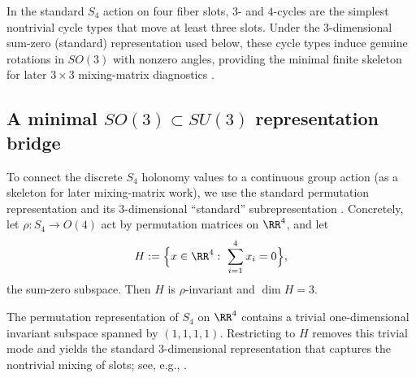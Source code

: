 \begin{remark}\label{rem:why_34_cycles}
In the standard $S_4$ action on four fiber slots, $3$- and $4$-cycles are the simplest nontrivial cycle types that move at least three slots.
Under the $3$-dimensional sum-zero (standard) representation used below, these cycle types induce genuine rotations in $SO(3)$ with nonzero angles, providing the minimal finite skeleton for later $3\times 3$ mixing-matrix diagnostics \cite{Serre1977}.
\end{remark}

\subsection{A minimal \texorpdfstring{$SO(3)\subset SU(3)$}{SO(3) subset SU(3)} representation bridge}
\label{subsec:holonomy_su3_bridge}

To connect the discrete $S_4$ holonomy values to a continuous group action (as a skeleton for later mixing-matrix work), we use the standard permutation representation and its $3$-dimensional ``standard'' subrepresentation \cite{Serre1977}.
Concretely, let $\rho:S_4\to O(4)$ act by permutation matrices on $\RR^4$, and let
\[
H:=\Bigl\{x\in\RR^4:\ \sum_{i=1}^4 x_i=0\Bigr\},
\]
the sum-zero subspace. Then $H$ is $\rho$-invariant and $\dim H=3$.
\begin{remark}\label{rem:sum_zero_canonical}
The permutation representation of $S_4$ on $\RR^4$ contains a trivial one-dimensional invariant subspace spanned by $(1,1,1,1)$.
Restricting to $H$ removes this trivial mode and yields the standard $3$-dimensional representation that captures the nontrivial mixing of slots; see, e.g., \cite{Serre1977}.
\end{remark}

